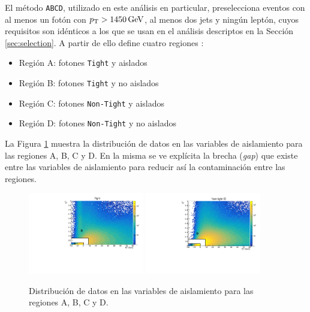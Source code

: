 El método \texttt{ABCD}, utilizado en este análisis en particular, preselecciona eventos con al menos un fotón con $p_{\text{T}}>1450\,\text{GeV}$, al menos dos jets y ningún leptón, cuyos requisitos son idénticos a los que se usan en el análisis descriptos en la Sección \ref{sec:selection}. A partir de ello define cuatro regiones \cite{ATL-COM-PHYS-2016-1626}:

\begin{itemize}
  \item Región A: fotones \texttt{Tight} y aislados
  \item Región B: fotones \texttt{Tight} y no aislados
  \item Región C: fotones \texttt{Non-Tight} y aislados
  \item Región D: fotones \texttt{Non-Tight} y no aislados
\end{itemize}

La Figura \ref{fig:abcd_regions} muestra la distribución de datos en las variables de aislamiento para las regiones A, B, C y D. En la misma se ve explícita la brecha (\textit{gap}) que existe entre las variables de aislamiento para reducir así la contaminación entre las regiones.

\begin{figure}
  \centering
  \includegraphics[width=0.45\textwidth]{images/analysis/tight_ABCD_data.pdf}
  \includegraphics[width=0.45\textwidth]{images/analysis/nontight_ABCD_data.pdf}
  \caption{Distribución de datos en las variables de aislamiento para las regiones A, B, C y D.}
  \label{fig:abcd_regions}
\end{figure}


